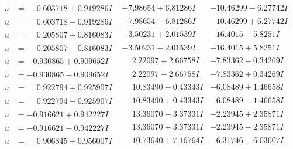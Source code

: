 \documentclass[1p]{elsarticle_modified}
\theoremstyle{definition}
\begin{document}
$$\begin{array}{c|c|c}
\begin{aligned}
u &= \phantom{-}0.603718 + 0.919286 I\end{aligned}
 & -7.98654 + 6.81286 I & -10.46299 - 6.27742 I \\ \hline\begin{aligned}
u &= \phantom{-}0.603718 - 0.919286 I\end{aligned}
 & -7.98654 - 6.81286 I & -10.46299 + 6.27742 I \\ \hline\begin{aligned}
u &= \phantom{-}0.205807 + 0.816083 I\end{aligned}
 & -3.50231 + 2.01539 I & -16.4015 - 5.8251 I \\ \hline\begin{aligned}
u &= \phantom{-}0.205807 - 0.816083 I\end{aligned}
 & -3.50231 - 2.01539 I & -16.4015 + 5.8251 I \\ \hline\begin{aligned}
u &= -0.930865 + 0.909652 I\end{aligned}
 & \phantom{-}2.22097 + 2.66758 I & -7.83362 - 0.34269 I \\ \hline\begin{aligned}
u &= -0.930865 - 0.909652 I\end{aligned}
 & \phantom{-}2.22097 - 2.66758 I & -7.83362 + 0.34269 I \\ \hline\begin{aligned}
u &= \phantom{-}0.922794 + 0.925907 I\end{aligned}
 & \phantom{-}10.83490 - 0.43343 I & -6.08489 + 1.46658 I \\ \hline\begin{aligned}
u &= \phantom{-}0.922794 - 0.925907 I\end{aligned}
 & \phantom{-}10.83490 + 0.43343 I & -6.08489 - 1.46658 I \\ \hline\begin{aligned}
u &= -0.916621 + 0.942227 I\end{aligned}
 & \phantom{-}13.36070 - 3.37331 I & -2.23945 + 2.35871 I \\ \hline\begin{aligned}
u &= -0.916621 - 0.942227 I\end{aligned}
 & \phantom{-}13.36070 + 3.37331 I & -2.23945 - 2.35871 I \\ \hline\begin{aligned}
u &= \phantom{-}0.906845 + 0.956007 I\end{aligned}
 & \phantom{-}10.73640 + 7.16764 I & -6.31746 - 6.03607 I \\ \hline\begin{aligned}

\end{aligned}
\end{array}$$
\end{document}

